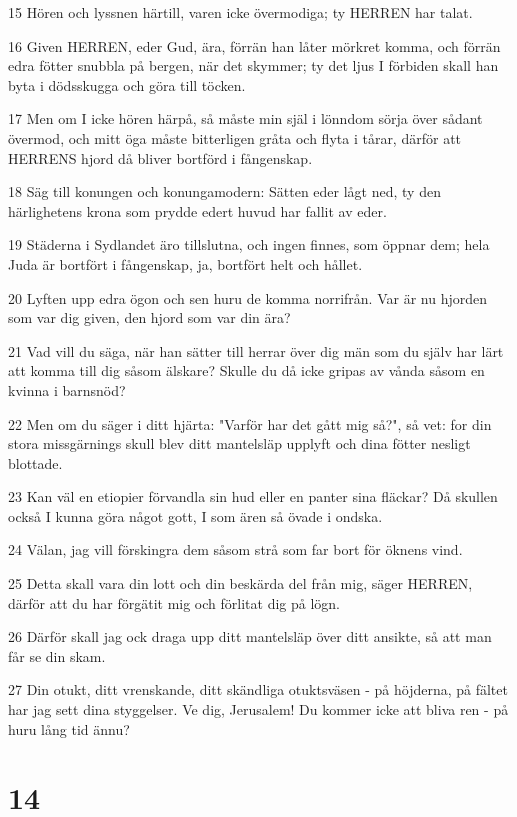 \par 15 Hören och lyssnen härtill, varen icke övermodiga; ty HERREN har talat.
\par 16 Given HERREN, eder Gud, ära, förrän han låter mörkret komma, och förrän edra fötter snubbla på bergen, när det skymmer; ty det ljus I förbiden skall han byta i dödsskugga och göra till töcken.
\par 17 Men om I icke hören härpå, så måste min själ i lönndom sörja över sådant övermod, och mitt öga måste bitterligen gråta och flyta i tårar, därför att HERRENS hjord då bliver bortförd i fångenskap.
\par 18 Säg till konungen och konungamodern: Sätten eder lågt ned, ty den härlighetens krona som prydde edert huvud har fallit av eder.
\par 19 Städerna i Sydlandet äro tillslutna, och ingen finnes, som öppnar dem; hela Juda är bortfört i fångenskap, ja, bortfört helt och hållet.
\par 20 Lyften upp edra ögon och sen huru de komma norrifrån. Var är nu hjorden som var dig given, den hjord som var din ära?
\par 21 Vad vill du säga, när han sätter till herrar över dig män som du själv har lärt att komma till dig såsom älskare? Skulle du då icke gripas av vånda såsom en kvinna i barnsnöd?
\par 22 Men om du säger i ditt hjärta: "Varför har det gått mig så?", så vet: for din stora missgärnings skull blev ditt mantelsläp upplyft och dina fötter nesligt blottade.
\par 23 Kan väl en etiopier förvandla sin hud eller en panter sina fläckar? Då skullen också I kunna göra något gott, I som ären så övade i ondska.
\par 24 Välan, jag vill förskingra dem såsom strå som far bort för öknens vind.
\par 25 Detta skall vara din lott och din beskärda del från mig, säger HERREN, därför att du har förgätit mig och förlitat dig på lögn.
\par 26 Därför skall jag ock draga upp ditt mantelsläp över ditt ansikte, så att man får se din skam.
\par 27 Din otukt, ditt vrenskande, ditt skändliga otuktsväsen - på höjderna, på fältet har jag sett dina styggelser. Ve dig, Jerusalem! Du kommer icke att bliva ren - på huru lång tid ännu?

\chapter{14}

